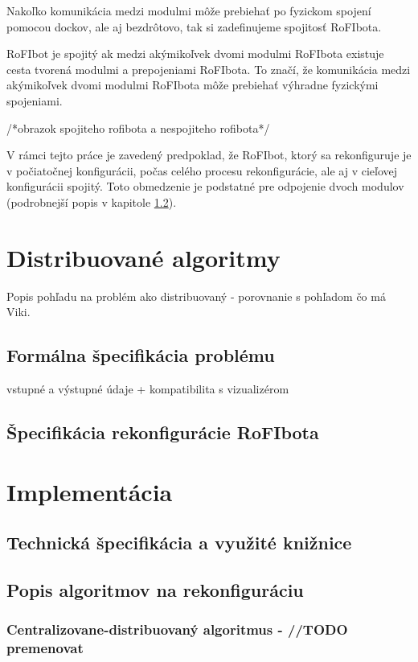 \documentclass[
  digital, %
  twoside, %
  table,   %
  nolof,     %
  nolot,     %
]{fithesis3}
\begin{document}
Nakoľko komunikácia medzi modulmi môže prebiehať po fyzickom spojení pomocou dockov, ale aj bezdrôtovo, tak si zadefinujeme spojitosť RoFIbota. 

RoFIbot je spojitý ak medzi akýmikoľvek dvomi modulmi RoFIbota existuje cesta tvorená modulmi a prepojeniami RoFIbota. To značí, že komunikácia medzi akýmikoľvek dvomi modulmi RoFIbota môže prebiehať výhradne fyzickými spojeniami. 

/*obrazok spojiteho rofibota a nespojiteho rofibota*/

V rámci tejto práce je zavedený predpoklad, že RoFIbot, ktorý sa rekonfiguruje je v počiatočnej konfigurácii, počas celého procesu rekonfigurácie, ale aj v cieľovej konfigurácii spojitý. Toto obmedzenie je podstatné pre odpojenie dvoch modulov (podrobnejší popis v kapitole \ref{sec:reconfigActions}). 

\chapter{Distribuované algoritmy}
\label{sec:distributedAlgo}
Popis pohľadu na problém ako distribuovaný - porovnanie s pohľadom čo má Viki. 

\section{Formálna špecifikácia problému}
\label{sec:inputOutput}
vstupné a výstupné údaje + kompatibilita s vizualizérom

\section{Špecifikácia rekonfigurácie RoFIbota}
\label{sec:reconfigActions}


\chapter{Implementácia}
\section{Technická špecifikácia a využité knižnice}
\section{Popis algoritmov na rekonfiguráciu}
\subsection{Centralizovane-distribuovaný algoritmus - //TODO premenovat}
\end{document}

